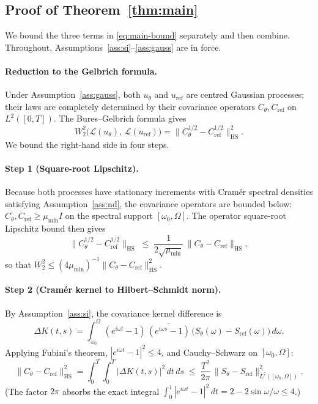 \documentclass[11pt,a4paper]{article}
\newcommand{\HS}{\mathrm{HS}}
\begin{document}
\subsection{Proof of Theorem~\ref{thm:main}}

We bound the three terms in \eqref{eq:main-bound} separately and then
combine. Throughout, Assumptions~\ref{ass:si}--\ref{ass:gauss} are in force.

\paragraph{Reduction to the Gelbrich formula.}
Under Assumption~\ref{ass:gauss}, both $u_\theta$ and $u_{\mathrm{ref}}$
are centred Gaussian processes; their laws are completely determined by
their covariance operators $C_\theta, C_{\mathrm{ref}}$ on $L^2([0,T])$.
The Bures--Gelbrich formula \citep{gelbrich1990formula} gives
\begin{equation}\label{eq:gelbrich-main}
 W_2^2\!\bigl(\mathcal{L}(u_\theta),\,\mathcal{L}(u_{\mathrm{ref}})\bigr)
 = \bigl\|C_\theta^{1/2} - C_{\mathrm{ref}}^{1/2}\bigr\|_{\HS}^2.
\end{equation}
We bound the right-hand side in four steps.

\paragraph{Step 1 (Square-root Lipschitz).}
Because both processes have stationary increments with Cram\'er spectral
densities satisfying Assumption~\ref{ass:nd}, the covariance operators are
bounded below: $C_\theta, C_{\mathrm{ref}} \geq \mu_{\min} I$ on the
spectral support $[\omega_0,\Omega]$. The operator square-root Lipschitz
bound \citep[Thm.~X.1.1]{bhatia1997matrix} then gives
\begin{equation}\label{eq:sqrt-lip}
 \bigl\|C_\theta^{1/2} - C_{\mathrm{ref}}^{1/2}\bigr\|_{\HS}
 \;\leq\;
 \frac{1}{2\sqrt{\mu_{\min}}}\,
 \bigl\|C_\theta - C_{\mathrm{ref}}\bigr\|_{\HS},
\end{equation}
so that $W_2^2 \leq (4\mu_{\min})^{-1}\|C_\theta - C_{\mathrm{ref}}\|_{\HS}^2$.

\paragraph{Step 2 (Cram\'er kernel to Hilbert--Schmidt norm).}
By Assumption~\ref{ass:si}, the covariance kernel difference is
\[
 \Delta K(t,s) = \int_{\omega_0}^{\Omega}
  (e^{i\omega t}-1)\,\overline{(e^{i\omega s}-1)}\,
  \bigl(S_\theta(\omega)-S_{\mathrm{ref}}(\omega)\bigr)\,d\omega.
\]
Applying Fubini's theorem, $|e^{i\omega t}-1|^2 \leq 4$, and
Cauchy--Schwarz on $[\omega_0,\Omega]$:
\begin{equation}\label{eq:parseval-main}
 \bigl\|C_\theta - C_{\mathrm{ref}}\bigr\|_{\HS}^2
 = \int_0^T\!\!\int_0^T |\Delta K(t,s)|^2\,dt\,ds
 \;\leq\;
 \frac{T^2}{2\pi}\,
 \bigl\|S_\theta - S_{\mathrm{ref}}\bigr\|_{L^2([\omega_0,\Omega])}^2.
\end{equation}
(The factor $2\pi$ absorbs the exact integral
$\int_0^1|e^{i\omega t}-1|^2\,dt = 2-2\sin\omega/\omega \leq 4$.)
\end{document}
